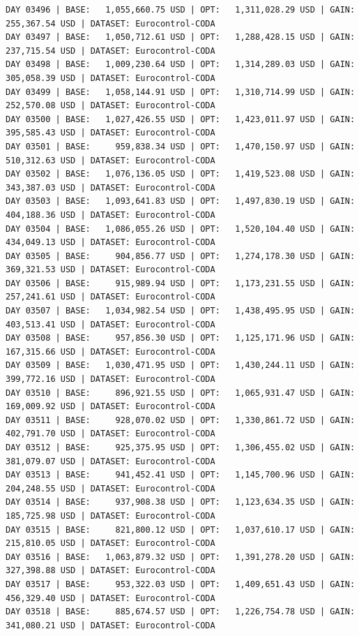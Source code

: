 \documentclass[11pt,a4paper]{article}
\begin{document}
\begin{verbatim}
DAY 03496 | BASE:   1,055,660.75 USD | OPT:   1,311,028.29 USD | GAIN: 255,367.54 USD | DATASET: Eurocontrol-CODA
DAY 03497 | BASE:   1,050,712.61 USD | OPT:   1,288,428.15 USD | GAIN: 237,715.54 USD | DATASET: Eurocontrol-CODA
DAY 03498 | BASE:   1,009,230.64 USD | OPT:   1,314,289.03 USD | GAIN: 305,058.39 USD | DATASET: Eurocontrol-CODA
DAY 03499 | BASE:   1,058,144.91 USD | OPT:   1,310,714.99 USD | GAIN: 252,570.08 USD | DATASET: Eurocontrol-CODA
DAY 03500 | BASE:   1,027,426.55 USD | OPT:   1,423,011.97 USD | GAIN: 395,585.43 USD | DATASET: Eurocontrol-CODA
DAY 03501 | BASE:     959,838.34 USD | OPT:   1,470,150.97 USD | GAIN: 510,312.63 USD | DATASET: Eurocontrol-CODA
DAY 03502 | BASE:   1,076,136.05 USD | OPT:   1,419,523.08 USD | GAIN: 343,387.03 USD | DATASET: Eurocontrol-CODA
DAY 03503 | BASE:   1,093,641.83 USD | OPT:   1,497,830.19 USD | GAIN: 404,188.36 USD | DATASET: Eurocontrol-CODA
DAY 03504 | BASE:   1,086,055.26 USD | OPT:   1,520,104.40 USD | GAIN: 434,049.13 USD | DATASET: Eurocontrol-CODA
DAY 03505 | BASE:     904,856.77 USD | OPT:   1,274,178.30 USD | GAIN: 369,321.53 USD | DATASET: Eurocontrol-CODA
DAY 03506 | BASE:     915,989.94 USD | OPT:   1,173,231.55 USD | GAIN: 257,241.61 USD | DATASET: Eurocontrol-CODA
DAY 03507 | BASE:   1,034,982.54 USD | OPT:   1,438,495.95 USD | GAIN: 403,513.41 USD | DATASET: Eurocontrol-CODA
DAY 03508 | BASE:     957,856.30 USD | OPT:   1,125,171.96 USD | GAIN: 167,315.66 USD | DATASET: Eurocontrol-CODA
DAY 03509 | BASE:   1,030,471.95 USD | OPT:   1,430,244.11 USD | GAIN: 399,772.16 USD | DATASET: Eurocontrol-CODA
DAY 03510 | BASE:     896,921.55 USD | OPT:   1,065,931.47 USD | GAIN: 169,009.92 USD | DATASET: Eurocontrol-CODA
DAY 03511 | BASE:     928,070.02 USD | OPT:   1,330,861.72 USD | GAIN: 402,791.70 USD | DATASET: Eurocontrol-CODA
DAY 03512 | BASE:     925,375.95 USD | OPT:   1,306,455.02 USD | GAIN: 381,079.07 USD | DATASET: Eurocontrol-CODA
DAY 03513 | BASE:     941,452.41 USD | OPT:   1,145,700.96 USD | GAIN: 204,248.55 USD | DATASET: Eurocontrol-CODA
DAY 03514 | BASE:     937,908.38 USD | OPT:   1,123,634.35 USD | GAIN: 185,725.98 USD | DATASET: Eurocontrol-CODA
DAY 03515 | BASE:     821,800.12 USD | OPT:   1,037,610.17 USD | GAIN: 215,810.05 USD | DATASET: Eurocontrol-CODA
DAY 03516 | BASE:   1,063,879.32 USD | OPT:   1,391,278.20 USD | GAIN: 327,398.88 USD | DATASET: Eurocontrol-CODA
DAY 03517 | BASE:     953,322.03 USD | OPT:   1,409,651.43 USD | GAIN: 456,329.40 USD | DATASET: Eurocontrol-CODA
DAY 03518 | BASE:     885,674.57 USD | OPT:   1,226,754.78 USD | GAIN: 341,080.21 USD | DATASET: Eurocontrol-CODA

\end{verbatim}
\end{document}
